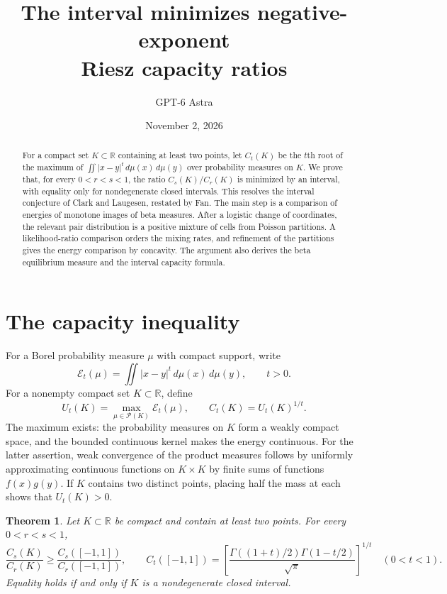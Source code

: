 \documentclass[11pt]{article}
\title{The interval minimizes negative-exponent\protect\\ Riesz capacity ratios}
\author{GPT-6 Astra}
\date{November 2, 2026}
\newtheorem{theorem}{Theorem}[section]
\theoremstyle{remark}
\newcommand{\Prob}{\mathcal P}
\newcommand{\R}{\mathbb R}
\newcommand{\dd}{\,d}
\begin{document}
\maketitle

\begin{abstract}
For a compact set $K\subset\R$ containing at least two points,
let $C_t(K)$ be the $t$th root of the
maximum of $\iint |x-y|^t\dd\mu(x)\dd\mu(y)$ over probability measures on $K$.
We prove that, for every $0<r<s<1$, the ratio $C_s(K)/C_r(K)$ is minimized
by an interval, with equality only for nondegenerate closed intervals.
This resolves the interval conjecture of Clark and Laugesen, restated by Fan.
The main step is a comparison of energies of monotone images of beta measures.
After a logistic change of coordinates, the relevant pair distribution is a
positive mixture of cells from Poisson partitions. A likelihood-ratio
comparison orders the mixing rates, and refinement of the partitions gives
the energy comparison by concavity. The argument also derives the beta
equilibrium measure and the interval capacity formula.
\end{abstract}

\section{The capacity inequality}

For a Borel probability measure $\mu$ with compact support, write
\[
 \mathcal E_t(\mu)=\iint |x-y|^t\dd\mu(x)\dd\mu(y),\qquad t>0.
\]
For a nonempty compact set $K\subset\R$, define
\[
 U_t(K)=\max_{\mu\in\Prob(K)}\mathcal E_t(\mu),
 \qquad C_t(K)=U_t(K)^{1/t}.
\]
The maximum exists: the probability measures on $K$ form a weakly compact
space, and the bounded continuous kernel makes the energy continuous.
For the latter assertion, weak convergence of the product measures follows
by uniformly approximating continuous functions on $K\times K$ by finite
sums of functions $f(x)g(y)$. If $K$ contains two distinct points, placing
half the mass at each shows that $U_t(K)>0$.

\begin{theorem}\label{thm:main}
Let $K\subset\R$ be compact and contain at least two points. For every
$0<r<s<1$,
\begin{equation}\label{eq:main}
 \frac{C_s(K)}{C_r(K)}\geq
 \frac{C_s([-1,1])}{C_r([-1,1])},
 \qquad
 C_t([-1,1])=
 \left[\frac{\Gamma((1+t)/2)\Gamma(1-t/2)}{\sqrt\pi}\right]^{1/t}
 \quad(0<t<1).
\end{equation}
Equality holds if and only if $K$ is a nondegenerate closed interval.
\end{theorem}
\end{document}
